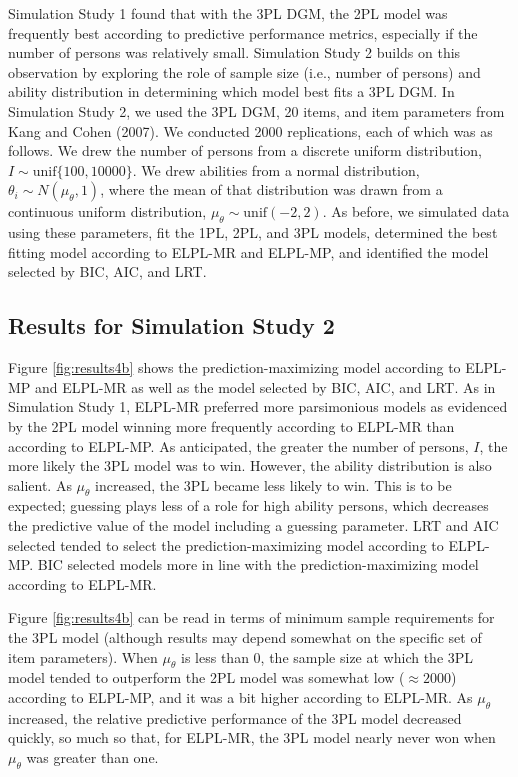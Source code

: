 \documentclass[
  english,
  man,floatsintext]{apa7}
\begin{document}
Simulation Study 1 found that with the 3PL DGM, the 2PL model was frequently best according to predictive performance metrics, especially if the number of persons was relatively small. Simulation Study 2 builds on this observation by exploring the role of sample size (i.e., number of persons) and ability distribution in determining which model best fits a 3PL DGM. In Simulation Study 2, we used the 3PL DGM, 20 items, and item parameters from Kang and Cohen (2007). We conducted 2000 replications, each of which was as follows. We drew the number of persons from a discrete uniform distribution, \(I \sim \text{unif}\{100, 10000\}\). We drew abilities from a normal distribution, \(\theta_i \sim N(\mu_{\theta} , 1)\), where the mean of that distribution was drawn from a continuous uniform distribution, \(\mu_{\theta} \sim \text{unif}(-2, 2)\). As before, we simulated data using these parameters, fit the 1PL, 2PL, and 3PL models, determined the best fitting model according to ELPL-MR and ELPL-MP, and identified the model selected by BIC, AIC, and LRT.

\hypertarget{results-for-simulation-study-2}{%
\subsection{Results for Simulation Study 2}\label{results-for-simulation-study-2}}

Figure \ref{fig:results4b} shows the prediction-maximizing model according to ELPL-MP and ELPL-MR as well as the model selected by BIC, AIC, and LRT. As in Simulation Study 1, ELPL-MR preferred more parsimonious models as evidenced by the 2PL model winning more frequently according to ELPL-MR than according to ELPL-MP. As anticipated, the greater the number of persons, \(I\), the more likely the 3PL model was to win. However, the ability distribution is also salient. As \(\mu_{\theta}\) increased, the 3PL became less likely to win. This is to be expected; guessing plays less of a role for high ability persons, which decreases the predictive value of the model including a guessing parameter. LRT and AIC selected tended to select the prediction-maximizing model according to ELPL-MP. BIC selected models more in line with the prediction-maximizing model according to ELPL-MR.

Figure \ref{fig:results4b} can be read in terms of minimum sample requirements for the 3PL model (although results may depend somewhat on the specific set of item parameters). When \(\mu_{\theta}\) is less than 0, the sample size at which the 3PL model tended to outperform the 2PL model was somewhat low (\(\approx 2000\)) according to ELPL-MP, and it was a bit higher according to ELPL-MR. As \(\mu_{\theta}\) increased, the relative predictive performance of the 3PL model decreased quickly, so much so that, for ELPL-MR, the 3PL model nearly never won when \(\mu_{\theta}\) was greater than one.
\end{document}
